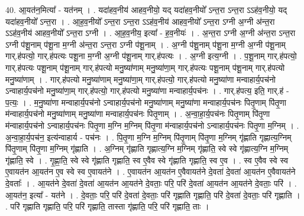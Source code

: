 \documentclass[17pt]{extarticle}
\begin{document}
40. आ॒यत॑न॒मित्या᳚ - यत॑नम् । . यदा॑हव॒नीय॑ आहव॒नीयो॒ यद् यदा॑हव॒नीयो᳚ ऽन्त॒रा ऽन्त॒रा ऽऽह॑व॒नीयो॒ यद् यदा॑हव॒नीयो᳚ ऽन्त॒रा । . आ॒ह॒व॒नीयो᳚ ऽन्त॒रा ऽन्त॒रा ऽऽह॑व॒नीय॑ आहव॒नीयो᳚ ऽन्त॒रा ऽग्नी अ॒ग्नी अ॑न्त॒रा ऽऽह॑व॒नीय॑ आहव॒नीयो᳚ ऽन्त॒रा ऽग्नी । . आ॒ह॒व॒नीय॒ इत्या᳚ - ह॒व॒नीयः॑ । . अ॒न्त॒रा ऽग्नी अ॒ग्नी अ॑न्त॒रा ऽन्त॒रा ऽग्नी प॑शू॒नाम् प॑शू॒ना म॒ग्नी अ॑न्त॒रा ऽन्त॒रा ऽग्नी प॑शू॒नाम् । . अ॒ग्नी प॑शू॒नाम् प॑शू॒ना म॒ग्नी अ॒ग्नी प॑शू॒नाम् गार्.ह॑पत्यो॒ गार्.ह॑पत्यः पशू॒ना म॒ग्नी अ॒ग्नी प॑शू॒नाम् गार्.ह॑पत्यः । . अ॒ग्नी इत्य॒ग्नी । . प॒शू॒नाम् गार्.ह॑पत्यो॒ गार्.ह॑पत्यः पशू॒नाम् प॑शू॒नाम् गार्.ह॑पत्यो मनु॒ष्या॑णाम् मनु॒ष्या॑णा॒म् गार्.ह॑पत्यः पशू॒नाम् प॑शू॒नाम् गार्.ह॑पत्यो मनु॒ष्या॑णाम् । . गार्.ह॑पत्यो मनु॒ष्या॑णाम् मनु॒ष्या॑णा॒म् गार्.ह॑पत्यो॒ गार्.ह॑पत्यो मनु॒ष्या॑णा मन्वाहार्य॒पच॑नो ऽन्वाहार्य॒पच॑नो मनु॒ष्या॑णा॒म् गार्.ह॑पत्यो॒ गार्.ह॑पत्यो मनु॒ष्या॑णा मन्वाहार्य॒पच॑नः । . गार्.ह॑पत्य॒ इति॒ गार्.ह॑ - प॒त्यः॒ । . म॒नु॒ष्या॑णा मन्वाहार्य॒पच॑नो ऽन्वाहार्य॒पच॑नो मनु॒ष्या॑णाम् मनु॒ष्या॑णा मन्वाहार्य॒पच॑नः पितृ॒णाम् पि॑तृ॒णा म॑न्वाहार्य॒पच॑नो मनु॒ष्या॑णाम् मनु॒ष्या॑णा मन्वाहार्य॒पच॑नः पितृ॒णाम् । . अ॒न्वा॒हा॒र्य॒पच॑नः पितृ॒णाम् पि॑तृ॒णा म॑न्वाहार्य॒पच॑नो ऽन्वाहार्य॒पच॑नः पितृ॒णा म॒ग्नि म॒ग्निम् पि॑तृ॒णा म॑न्वाहार्य॒पच॑नो ऽन्वाहार्य॒पच॑नः पितृ॒णा म॒ग्निम् । . अ॒न्वा॒हा॒र्य॒पच॑न॒ इत्य॑न्वाहार्य - पच॑नः । . पि॒तृ॒णा म॒ग्नि म॒ग्निम् पि॑तृ॒णाम् पि॑तृ॒णा म॒ग्निम् गृ॑ह्णाति गृह्णात्य॒ग्निम् पि॑तृ॒णाम् पि॑तृ॒णा म॒ग्निम् गृ॑ह्णाति । . अ॒ग्निम् गृ॑ह्णाति गृह्णात्य॒ग्नि म॒ग्निम् गृ॑ह्णाति॒ स्वे स्वे गृ॑ह्णात्य॒ग्नि म॒ग्निम् गृ॑ह्णाति॒ स्वे । . गृ॒ह्णा॒ति॒ स्वे स्वे गृ॑ह्णाति गृह्णाति॒ स्व ए॒वैव स्वे गृ॑ह्णाति गृह्णाति॒ स्व ए॒व । . स्व ए॒वैव स्वे स्व ए॒वायत॑न आ॒यत॑न ए॒व स्वे स्व ए॒वायत॑ने । . ए॒वायत॑न आ॒यत॑न ए॒वैवायत॑ने दे॒वता॑ दे॒वता॑ आ॒यत॑न ए॒वैवायत॑ने दे॒वताः᳚ । . आ॒यत॑ने दे॒वता॑ दे॒वता॑ आ॒यत॑न आ॒यत॑ने दे॒वताः॒ परि॒ परि॑ दे॒वता॑ आ॒यत॑न आ॒यत॑ने दे॒वताः॒ परि॑ । . आ॒यत॑न॒ इत्या᳚ - यत॑ने । . दे॒वताः॒ परि॒ परि॑ दे॒वता॑ दे॒वताः॒ परि॑ गृह्णाति गृह्णाति॒ परि॑ दे॒वता॑ दे॒वताः॒ परि॑ गृह्णाति । . परि॑ गृह्णाति गृह्णाति॒ परि॒ परि॑ गृह्णाति॒ तास्ता गृ॑ह्णाति॒ परि॒ परि॑ गृह्णाति॒ ताः । \newline
\pagebreak
{}
\end{document}
